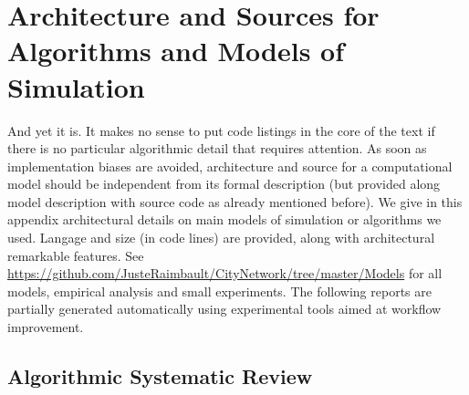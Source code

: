 


\chapter{Architecture and Sources for Algorithms and Models of Simulation} %

\label{app:code} %










And yet it is. It makes no sense to put code listings in the core of the text if there is no particular algorithmic detail that requires attention. As soon as implementation biases are avoided, architecture and source for a computational model should be independent from its formal description (but provided along model description with source code as already mentioned before). We give in this appendix architectural details on main models of simulation or algorithms we used. Langage and size (in code lines) are provided, along with architectural remarkable features. See \url{https://github.com/JusteRaimbault/CityNetwork/tree/master/Models} for all models, empirical analysis and small experiments. The following reports are partially generated automatically using experimental tools aimed at workflow improvement.




\section{Algorithmic Systematic Review}


